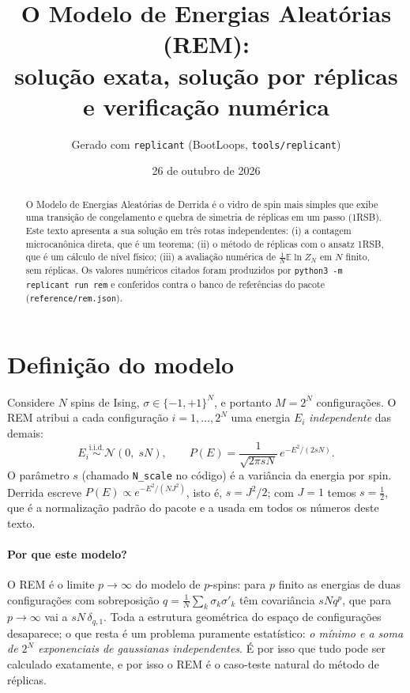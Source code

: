 \documentclass[11pt,a4paper]{article}
\title{O Modelo de Energias Aleatórias (REM):\\ solução exata, solução por réplicas e verificação numérica}
\author{Gerado com \texttt{replicant} (BootLoops, \texttt{tools/replicant})}
\date{26 de outubro de 2026}
\newcommand{\E}{\mathbb{E}}
\begin{document}
\maketitle

\begin{abstract}
O Modelo de Energias Aleatórias de Derrida \cite{derrida80,derrida81} é o vidro de spin mais simples
que exibe uma transição de congelamento e quebra de simetria de réplicas em um passo (1RSB). Este texto
apresenta a sua solução em três rotas independentes: (i) a contagem microcanônica direta, que é um
teorema; (ii) o método de réplicas com o ansatz 1RSB, que é um cálculo de nível físico; (iii) a
avaliação numérica de $\frac1N\E\ln Z_N$ em $N$ finito, sem réplicas. Os valores numéricos citados
foram produzidos por \texttt{python3 -m replicant run rem} e conferidos contra o banco de referências do
pacote (\texttt{reference/rem.json}).
\end{abstract}

\tableofcontents

\section{Definição do modelo}

Considere $N$ spins de Ising, $\sigma\in\{-1,+1\}^N$, e portanto $M=2^N$ configurações. O REM atribui a cada
configuração $i=1,\dots,2^N$ uma energia $E_i$ \emph{independente} das demais:
\begin{equation}
  E_i \stackrel{\text{i.i.d.}}{\sim} \mathcal N\!\left(0,\; sN\right),
  \qquad
  P(E)=\frac{1}{\sqrt{2\pi s N}}\,e^{-E^2/(2sN)} .
  \label{eq:modelo}
\end{equation}
O parâmetro $s$ (chamado \texttt{N\_scale} no código) é a variância da energia por spin. Derrida escreve
$P(E)\propto e^{-E^2/(NJ^2)}$, isto é, $s=J^2/2$; com $J=1$ temos $s=\tfrac12$, que é a normalização
padrão do pacote e a usada em todos os números deste texto.

\paragraph{Por que este modelo?} O REM é o limite $p\to\infty$ do modelo de $p$-spins: para $p$ finito
as energias de duas configurações com sobreposição $q=\frac1N\sum_k\sigma_k\sigma'_k$ têm covariância
$sN q^p$, que para $p\to\infty$ vai a $sN\,\delta_{q,1}$. Toda a estrutura geométrica do espaço de
configurações desaparece; o que resta é um problema puramente estatístico: \emph{o mínimo e a soma de
$2^N$ exponenciais de gaussianas independentes}. É por isso que tudo pode ser calculado
exatamente, e por isso o REM é o caso-teste natural do método de réplicas.
\end{document}
